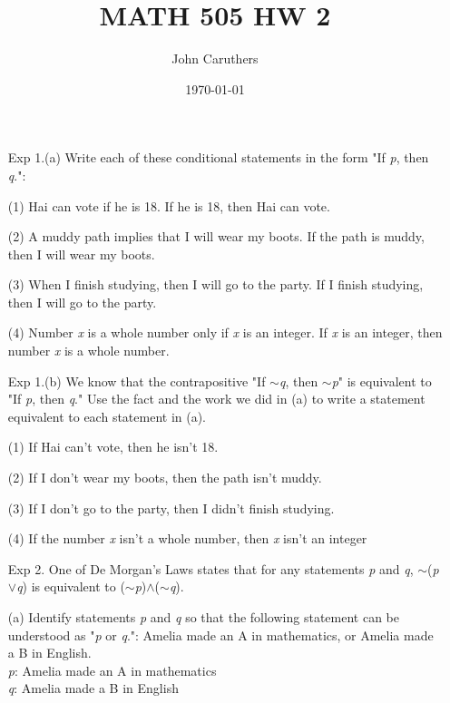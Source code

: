 \documentclass{article}
\title{MATH 505 HW 2}
\author{John Caruthers}
\date\today
\begin{document}
\maketitle

\begin{itemize}
    \item [Exp 1.(a)] Write each of these conditional statements in the form "If \emph{p}, then \emph{q}.":
    
    (1) Hai can vote if he is 18. {\color{blue} If he is 18, then Hai can vote.}
    
    (2) A muddy path implies that I will wear my boots. {\color{blue} If the path is muddy, then I will wear my boots.}
    
    (3) When I finish studying, then I will go to the party. {\color{blue} If I finish studying, then I will go to the party.}
    
    (4) Number \emph{x} is a whole number only if \emph{x} is an integer. {\color{blue} If \emph{x} is an integer, then number \emph{x} is a whole number.}
    
    \item [Exp 1.(b)] We know that the contrapositive "If $\sim$\emph{q}, then $\sim$\emph{p}" is equivalent to "If \emph{p}, then \emph{q}." Use the fact and the work we did in (a) to write a statement equivalent to each statement in (a).
    
    (1) If Hai can't vote, then he isn't 18.
    
    (2) If I don't wear my boots, then the path isn't muddy.
    
    (3) If I don't go to the party, then I didn't finish studying.
    
    (4) If the number \emph{x} isn't a whole number, then \emph{x} isn't an integer
    
    \item [Exp 2.] One of De Morgan's Laws states that for any statements \emph{p} and \emph{q}, $\sim$(\emph{p}$\vee$\emph{q}) is equivalent to ($\sim$\emph{p})$\wedge$($\sim$\emph{q}).
    
    (a) Identify statements \emph{p} and \emph{q} so that the following statement can be understood as "\emph{p} or \emph{q}.": Amelia made an A in mathematics, or Amelia made a B in English.\\
    \hspace*{1cm}\emph{p}: Amelia made an A in mathematics\\
    \hspace*{1cm}\emph{q}: Amelia made a B in English
    

\end{itemize}
\end{document}
